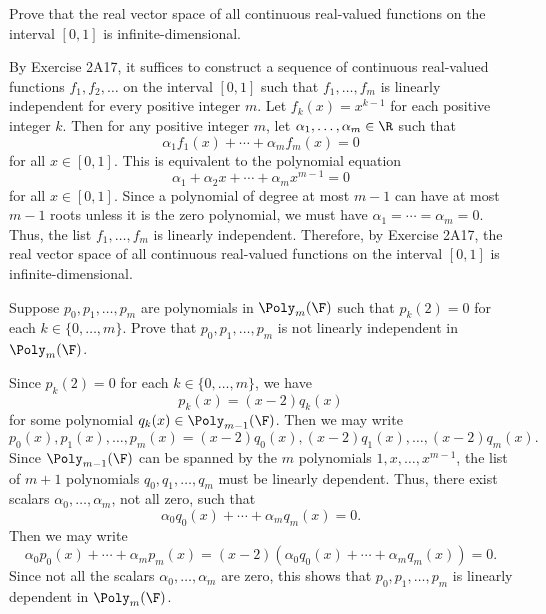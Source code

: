 \begin{exercise}
Prove that the real vector space of all continuous real-valued functions on the
interval $[0,1]$ is infinite-dimensional.
\end{exercise}
\begin{solution}
By Exercise 2A17, it suffices to construct a sequence of continuous real-valued
functions $f_1,f_2,\dots$ on the interval $[0,1]$ such that $f_1,\dots,f_m$ is
linearly independent for every positive integer $m$. Let $f_k(x)=x^{k-1}$ for
each positive integer $k$. Then for any positive integer $m$, let
$\alpha_1,\dots,\alpha_m\in\R$ such that
\[ \alpha_1f_1(x)+\cdots+\alpha_mf_m(x)=0 \]
for all $x\in[0,1]$. This is equivalent to the polynomial equation
\[ \alpha_1+\alpha_2x+\cdots+\alpha_mx^{m-1}=0 \]
for all $x\in[0,1]$. Since a polynomial of degree at most $m-1$ can have at
most $m-1$ roots unless it is the zero polynomial, we must have
$\alpha_1=\cdots=\alpha_m=0$. Thus, the list $f_1,\dots,f_m$ is linearly
independent. Therefore, by Exercise 2A17, the real vector space of all
continuous real-valued functions on the interval $[0,1]$ is
infinite-dimensional.
\end{solution}

\begin{exercise}
Suppose $p_0,p_1,\dots,p_m$ are polynomials in $\Poly_m(\F)$ such that
$p_k(2)=0$ for each $k\in\{0,\dots,m\}$. Prove that $p_0,p_1,\dots,p_m$ is not
linearly independent in $\Poly_m(\F)$.
\end{exercise}
\begin{solution}
Since $p_k(2)=0$ for each $k\in\{0,\dots,m\}$, we have
\[ p_k(x)=(x-2)q_k(x) \]
for some polynomial $q_k(x)\in\Poly_{m-1}(\F)$. Then we may write
\[ p_0(x),p_1(x),\dots,p_m(x)=(x-2)q_0(x),(x-2)q_1(x),\dots,(x-2)q_m(x). \]
Since $\Poly_{m-1}(\F)$ can be spanned by the $m$ polynomials
$1,x,\dots,x^{m-1}$, the list of $m+1$ polynomials $q_0,q_1,\dots,q_m$ must be
linearly dependent. Thus, there exist scalars $\alpha_0,\dots,\alpha_m$, not
all zero, such that
\[ \alpha_0q_0(x)+\cdots+\alpha_mq_m(x)=0. \]
Then we may write
\[ \alpha_0p_0(x)+\cdots+\alpha_mp_m(x)
   =(x-2)(\alpha_0q_0(x)+\cdots+\alpha_mq_m(x))=0. \]
Since not all the scalars $\alpha_0,\dots,\alpha_m$ are zero, this shows that
$p_0,p_1,\dots,p_m$ is linearly dependent in $\Poly_m(\F)$.
\end{solution}
